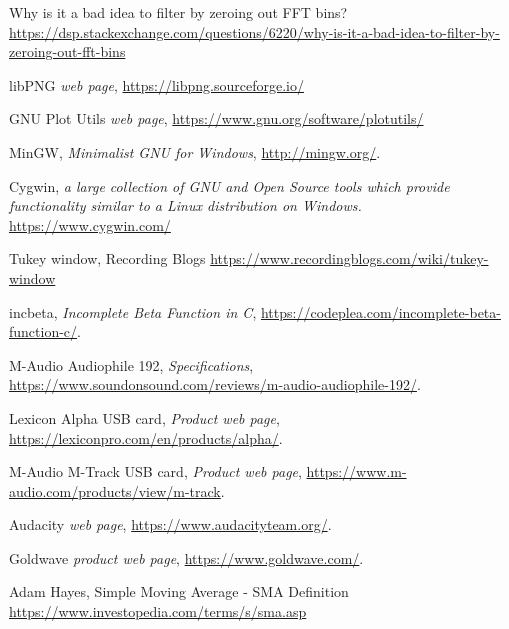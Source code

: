 \documentclass[10pt,a4paper]{report}
\begin{document}
\begin{thebibliography}{9}
	Why is it a bad idea to filter by zeroing out FFT bins?
	\url{https://dsp.stackexchange.com/questions/6220/why-is-it-a-bad-idea-to-filter-by-zeroing-out-fft-bins}
	
	libPNG
	\textit{web page},
	\url{https://libpng.sourceforge.io/}
	
	GNU Plot Utils
	\textit{web page},
	\url{https://www.gnu.org/software/plotutils/}
	
	MinGW, 
	\textit{Minimalist GNU for Windows},
	\url{http://mingw.org/}.
	
	Cygwin,
	\textit{a large collection of GNU and Open Source tools which provide functionality similar to a Linux distribution on Windows.}
	\url{https://www.cygwin.com/}
	
	Tukey window, Recording Blogs
	\url{https://www.recordingblogs.com/wiki/tukey-window}
	
	incbeta, 
	\textit{Incomplete Beta Function in C},
	\url{https://codeplea.com/incomplete-beta-function-c/}.
	
	M-Audio Audiophile 192,
	\textit{Specifications},
	\url{https://www.soundonsound.com/reviews/m-audio-audiophile-192/}.
	
	Lexicon Alpha USB card,
	\textit{Product web page},
	\url{https://lexiconpro.com/en/products/alpha/}.
	
	M-Audio M-Track USB card,
	\textit{Product web page},
	\url{	https://www.m-audio.com/products/view/m-track}.
	
	Audacity
	\textit{web page},
	\url{https://www.audacityteam.org/}.
	
	Goldwave
	\textit{product web page},
	\url{https://www.goldwave.com/}.
	
	Adam Hayes, Simple Moving Average - SMA Definition
	\url{https://www.investopedia.com/terms/s/sma.asp}
\end{thebibliography}

\printglossaries
\end{document}
